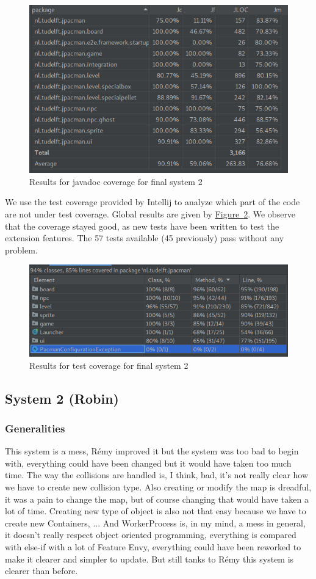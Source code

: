 \documentclass[]{article}
\newcommand{\wordlink}[2]{\hyperref[#2]{#1~\ref{#2}}}
\begin{document}
\vspace{0.3cm}

\begin{figure}[h]
\centering
\includegraphics[width=0.52\linewidth]{S1-doc_final}
\caption{Results for javadoc coverage for final system 2}
\label{fig:S1_javadoc_final}
\end{figure}

\newpage

We use the test coverage provided by Intellij to analyze which part of the code are not under test coverage. Global results are given by \wordlink{Figure}{fig:S1_testcover_final}. We observe that the coverage stayed good, as new tests have been written to test the extension features. The 57 tests available (45 previously) pass without any problem.\\

\begin{figure}[h]
\centering
\includegraphics[width=0.8\linewidth]{S1-testcover_final}
\caption{Results for test coverage for final system 2}
\label{fig:S1_testcover_final}
\end{figure}

\subsection{System 2 (Robin)}

\subsubsection{Generalities}

This system is a mess, Rémy improved it but the system was too bad to begin with, everything could have been changed but it would have taken too much time. The way the collisions are handled is, I think, bad, it's not really clear how we have to create new collision type. Also creating or modify the map is dreadful, it was a pain to change the map, but of course changing that would have taken a lot of time. Creating new type of object is also not that easy because we have to create new Containers, ... And WorkerProcess is, in my mind, a mess in general, it doesn't really respect object oriented programming, everything is compared with else-if with a lot of Feature Envy, everything could have been reworked to make it clearer and simpler to update. But still tanks to Rémy this system is clearer than before.
\end{document}
